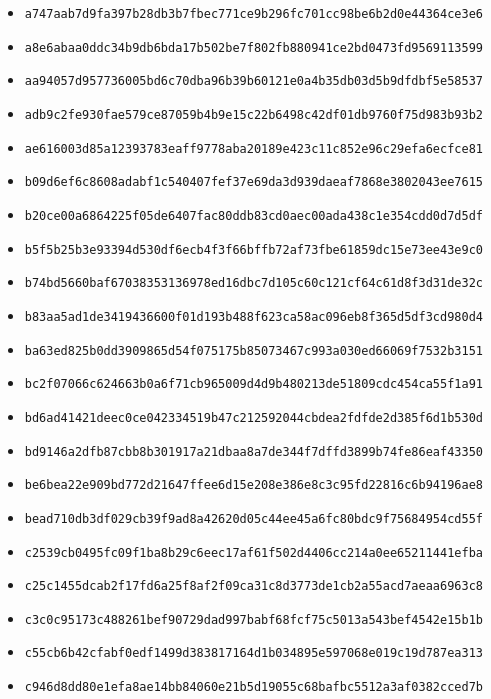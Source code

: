 {\begin{itemize}
    \item \texttt{a747aab7d9fa397b28db3b7fbec771ce9b296fc701cc98be6b2d0e44364ce3e6}
    \item \texttt{a8e6abaa0ddc34b9db6bda17b502be7f802fb880941ce2bd0473fd9569113599}
    \item \texttt{aa94057d957736005bd6c70dba96b39b60121e0a4b35db03d5b9dfdbf5e58537}
    \item \texttt{adb9c2fe930fae579ce87059b4b9e15c22b6498c42df01db9760f75d983b93b2}
    \item \texttt{ae616003d85a12393783eaff9778aba20189e423c11c852e96c29efa6ecfce81}
    \item \texttt{b09d6ef6c8608adabf1c540407fef37e69da3d939daeaf7868e3802043ee7615}
    \item \texttt{b20ce00a6864225f05de6407fac80ddb83cd0aec00ada438c1e354cdd0d7d5df}
    \item \texttt{b5f5b25b3e93394d530df6ecb4f3f66bffb72af73fbe61859dc15e73ee43e9c0}
    \item \texttt{b74bd5660baf67038353136978ed16dbc7d105c60c121cf64c61d8f3d31de32c}
    \item \texttt{b83aa5ad1de3419436600f01d193b488f623ca58ac096eb8f365d5df3cd980d4}
    \item \texttt{ba63ed825b0dd3909865d54f075175b85073467c993a030ed66069f7532b3151}
    \item \texttt{bc2f07066c624663b0a6f71cb965009d4d9b480213de51809cdc454ca55f1a91}
    \item \texttt{bd6ad41421deec0ce042334519b47c212592044cbdea2fdfde2d385f6d1b530d}
    \item \texttt{bd9146a2dfb87cbb8b301917a21dbaa8a7de344f7dffd3899b74fe86eaf43350}
    \item \texttt{be6bea22e909bd772d21647ffee6d15e208e386e8c3c95fd22816c6b94196ae8}
    \item \texttt{bead710db3df029cb39f9ad8a42620d05c44ee45a6fc80bdc9f75684954cd55f}
    \item \texttt{c2539cb0495fc09f1ba8b29c6eec17af61f502d4406cc214a0ee65211441efba}
    \item \texttt{c25c1455dcab2f17fd6a25f8af2f09ca31c8d3773de1cb2a55acd7aeaa6963c8}
    \item \texttt{c3c0c95173c488261bef90729dad997babf68fcf75c5013a543bef4542e15b1b}
    \item \texttt{c55cb6b42cfabf0edf1499d383817164d1b034895e597068e019c19d787ea313}
    \item \texttt{c946d8dd80e1efa8ae14bb84060e21b5d19055c68bafbc5512a3af0382cced7b}

\end{itemize}}
